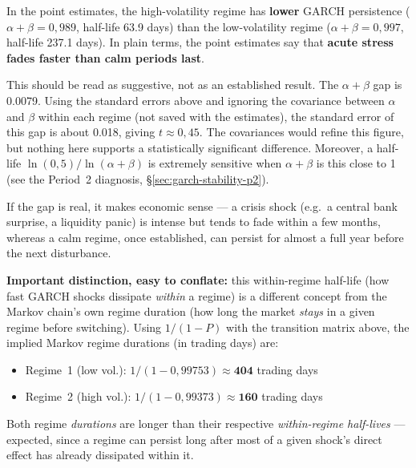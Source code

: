 \documentclass[12pt,a4paper]{article}
\begin{document}
In the point estimates, the high-volatility regime has
\textbf{lower} GARCH persistence ($\alpha+\beta=0{,}989$, half-life
63.9 days) than the low-volatility regime ($\alpha+\beta=0{,}997$,
half-life 237.1 days). In plain terms, the point estimates say that
\textbf{acute stress fades faster than calm periods last}.

\vspace{0.6cm}

\begin{limitbox}
	This should be read as suggestive, not as an established result.
	The $\alpha+\beta$ gap is 0.0079. Using the standard errors
	above and ignoring the covariance between $\alpha$ and $\beta$
	within each regime (not saved with the estimates),
	the standard error of this gap is about 0.018, giving $t \approx
	0{,}45$. The covariances would refine this figure, but nothing here
	supports a statistically significant difference. Moreover, a
	half-life $\ln(0{,}5)/\ln(\alpha+\beta)$ is extremely sensitive
	when $\alpha+\beta$ is this close to 1 (see the Period~2
	diagnosis, \S\ref{sec:garch-stability-p2}).
\end{limitbox}

If the gap is real, it makes economic sense --- a crisis
shock (e.g.\ a central bank surprise, a liquidity panic) is
intense but tends to fade within a few months, whereas a
calm regime, once established, can persist for almost a full year before
the next disturbance.

\newpage

\textbf{Important distinction, easy to conflate:} this
within-regime half-life (how fast GARCH shocks dissipate \emph{within}
a regime) is a different concept from the Markov chain's own
regime duration (how long the market \emph{stays} in a
given regime before switching). Using
$1/(1-P)$ with the transition matrix above, the implied
Markov regime durations (in trading days) are:

\vspace{0.2cm}

\begin{itemize}
	\item Regime~1 (low vol.): $1/(1-0{,}99753) \approx \mathbf{404}$ trading days
	\item Regime~2 (high vol.): $1/(1-0{,}99373) \approx \mathbf{160}$ trading days
\end{itemize}

Both regime \emph{durations} are longer than their respective
\emph{within-regime half-lives} --- expected, since a regime
can persist long after most of a given shock's direct effect
has already dissipated within it.
\end{document}

